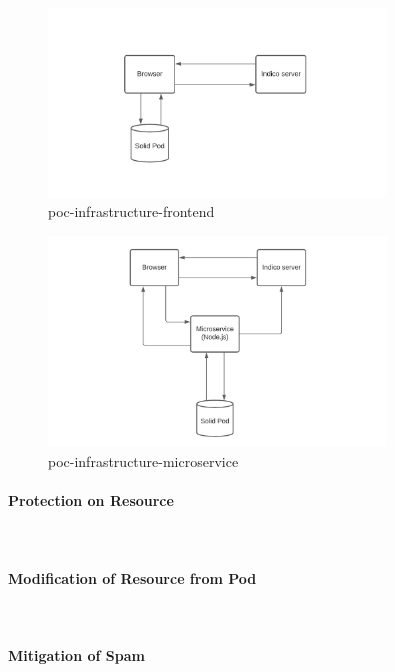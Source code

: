 \begin{figure}
    \centering
    \includegraphics[width=0.8\textwidth]{prototype/graphs/poc-infrastructure-frontend.jpeg}
    \caption{poc-infrastructure-frontend}
    \label{fig:poc-infrastructure-frontend}
\end{figure}

\begin{figure}
    \centering
    \includegraphics[width=0.8\textwidth]{prototype/graphs/poc-infrastructure-microservice.jpeg}
    \caption{poc-infrastructure-microservice}
    \label{fig:poc-infrastructure-microservice}
\end{figure}



\paragraph{Protection on Resource}\mbox{}\\

\paragraph{Modification of Resource from Pod}\mbox{}\\

\paragraph{Mitigation of Spam}\mbox{}\\

